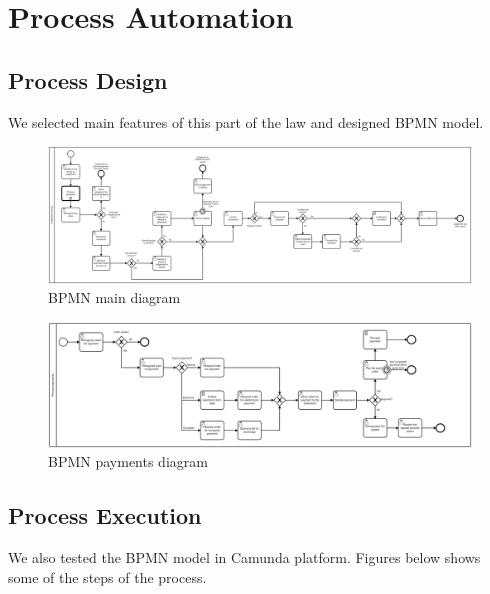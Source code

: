 \chapter{Process Automation}

\section{Process Design}

We selected main features of this part of the law and designed BPMN model.

\begin{landscape}

    \begin{figure}[h]\centering
        \includegraphics[width=22cm]{pic/bpmn}
        \caption{BPMN main diagram}
        \label{fig:bpmnModel}
    \end{figure}
    
    \begin{figure}[h]\centering
        \includegraphics[width=22cm]{pic/bpmn_payments}
        \caption{BPMN payments diagram}
        \label{fig:bpmnPaymentsModel}
    \end{figure}
    
    \end{landscape}
    
    \section{Process Execution}
    
    We also tested the BPMN model in Camunda platform. Figures below shows some of the steps of the process.

